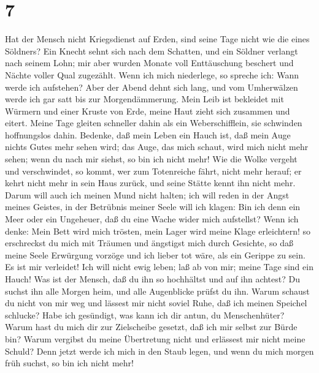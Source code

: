 \hypertarget{section-6}{%
\section{7}\label{section-6}}

 Hat der Mensch nicht Kriegsdienst auf Erden, sind seine
Tage nicht wie die eines Söldners?  Ein Knecht sehnt sich
nach dem Schatten, und ein Söldner verlangt nach seinem Lohn;
 mir aber wurden Monate voll Enttäuschung beschert und
Nächte voller Qual zugezählt.  Wenn ich mich niederlege,
so spreche ich: Wann werde ich aufstehen? Aber der Abend dehnt sich
lang, und vom Umherwälzen werde ich gar satt bis zur Morgendämmerung.
 Mein Leib ist bekleidet mit Würmern und einer Kruste von
Erde, meine Haut zieht sich zusammen und eitert.  Meine
Tage gleiten schneller dahin als ein Weberschifflein, sie schwinden
hoffnungslos dahin.  Bedenke, daß mein Leben ein Hauch
ist, daß mein Auge nichts Gutes mehr sehen wird;  das
Auge, das mich schaut, wird mich nicht mehr sehen; wenn du nach mir
siehst, so bin ich nicht mehr!  Wie die Wolke vergeht und
verschwindet, so kommt, wer zum Totenreiche fährt, nicht mehr herauf;
 er kehrt nicht mehr in sein Haus zurück, und seine
Stätte kennt ihn nicht mehr.  Darum will auch ich meinen
Mund nicht halten; ich will reden in der Angst meines Geistes, in der
Betrübnis meiner Seele will ich klagen:  Bin ich denn ein
Meer oder ein Ungeheuer, daß du eine Wache wider mich aufstellst?
 Wenn ich denke: Mein Bett wird mich trösten, mein Lager
wird meine Klage erleichtern!  so erschreckst du mich mit
Träumen und ängstigst mich durch Gesichte,  so daß meine
Seele Erwürgung vorzöge und ich lieber tot wäre, als ein Gerippe zu
sein.  Es ist mir verleidet! Ich will nicht ewig leben;
laß ab von mir; meine Tage sind ein Hauch!  Was ist der
Mensch, daß du ihn so hochhältst und auf ihn achtest?  Du
suchst ihn alle Morgen heim, und alle Augenblicke prüfst du ihn.
 Warum schaust du nicht von mir weg und lässest mir nicht
soviel Ruhe, daß ich meinen Speichel schlucke?  Habe ich
gesündigt, was kann ich dir antun, du Menschenhüter? Warum hast du mich
dir zur Zielscheibe gesetzt, daß ich mir selbst zur Bürde bin?
 Warum vergibst du meine Übertretung nicht und erlässest
mir nicht meine Schuld? Denn jetzt werde ich mich in den Staub legen,
und wenn du mich morgen früh suchst, so bin ich nicht mehr!

